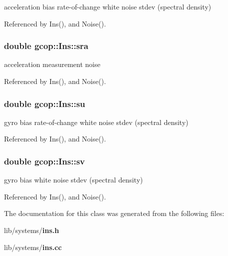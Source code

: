 acceleration bias rate-\/of-\/change white noise stdev (spectral density) 



\-Referenced by \-Ins(), and \-Noise().

\subsubsection[{sra}]{\setlength{\rightskip}{0pt plus 5cm}double {\bf gcop\-::\-Ins\-::sra}}\label{classgcop_1_1Ins_a6aa85ef7d93de3c2fe5a963b5f009e62}


acceleration measurement noise 



\-Referenced by \-Ins(), and \-Noise().

\subsubsection[{su}]{\setlength{\rightskip}{0pt plus 5cm}double {\bf gcop\-::\-Ins\-::su}}\label{classgcop_1_1Ins_ac4033034f6c1ecc2028f363a6ccd7d29}


gyro bias rate-\/of-\/change white noise stdev (spectral density) 



\-Referenced by \-Ins(), and \-Noise().

\subsubsection[{sv}]{\setlength{\rightskip}{0pt plus 5cm}double {\bf gcop\-::\-Ins\-::sv}}\label{classgcop_1_1Ins_a7a52e868dc3bb88c28b2fec419363a59}


gyro bias white noise stdev (spectral density) 



\-Referenced by \-Ins(), and \-Noise().



\-The documentation for this class was generated from the following files\-:\begin{DoxyCompactItemize}
\item 
lib/systems/{\bf ins.\-h}\item 
lib/systems/{\bf ins.\-cc}\end{DoxyCompactItemize}

